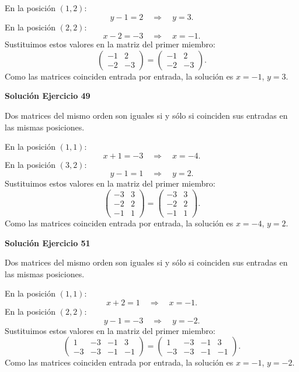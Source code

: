 \documentclass[12pt]{article}
\theoremstyle{remark}
\begin{document}
En la posición $(1,2)$:
\[
y - 1=2\quad\Longrightarrow\quad y=3.
\]
En la posición $(2,2)$:
\[
x - 2=-3\quad\Longrightarrow\quad x=-1.
\]
Sustituimos estos valores en la matriz del primer miembro:
\[
\begin{pmatrix}-1&2\\-2&-3\end{pmatrix}=\begin{pmatrix}-1&2\\-2&-3\end{pmatrix}.
\]
Como las matrices coinciden entrada por entrada, la solución es $x=-1$, $y=3$.


\par\bigskip\noindent\textbf{Solución Ejercicio 49}\par\nobreak
Dos matrices del mismo orden son iguales si y sólo si coinciden sus entradas en las mismas posiciones.

En la posición $(1,1)$:
\[
x + 1=-3\quad\Longrightarrow\quad x=-4.
\]
En la posición $(3,2)$:
\[
y - 1=1\quad\Longrightarrow\quad y=2.
\]
Sustituimos estos valores en la matriz del primer miembro:
\[
\begin{pmatrix}-3&3\\-2&2\\-1&1\end{pmatrix}=\begin{pmatrix}-3&3\\-2&2\\-1&1\end{pmatrix}.
\]
Como las matrices coinciden entrada por entrada, la solución es $x=-4$, $y=2$.


\par\bigskip\noindent\textbf{Solución Ejercicio 51}\par\nobreak
Dos matrices del mismo orden son iguales si y sólo si coinciden sus entradas en las mismas posiciones.

En la posición $(1,1)$:
\[
x + 2=1\quad\Longrightarrow\quad x=-1.
\]
En la posición $(2,2)$:
\[
y - 1=-3\quad\Longrightarrow\quad y=-2.
\]
Sustituimos estos valores en la matriz del primer miembro:
\[
\begin{pmatrix}1&-3&-1&3\\-3&-3&-1&-1\end{pmatrix}=\begin{pmatrix}1&-3&-1&3\\-3&-3&-1&-1\end{pmatrix}.
\]
Como las matrices coinciden entrada por entrada, la solución es $x=-1$, $y=-2$.
\end{document}
